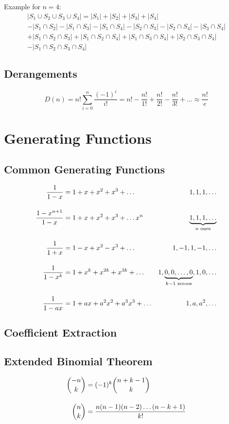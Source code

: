 \documentclass[12pt]{article}
\begin{document}
Example for $n=4:$
\newcommand{\dlist}[1]{S_{#1}}
\begin{multline*}
    |\dlist{1} \cup \dlist{2} \cup \dlist{3} \cup \dlist{4}| = |\dlist{1}| + |\dlist{2}| + |\dlist{3}| + |\dlist{4}|\\ 
    -|\dlist{1} \cap \dlist{2}| - |\dlist{1} \cap \dlist{3}| - |\dlist{1} \cap \dlist{4}| - |\dlist{2} \cap \dlist{3}| - |\dlist{2} \cap \dlist{4}| - |\dlist{3} \cap \dlist{4}|\\
    +|\dlist{1} \cap \dlist{2} \cap \dlist{3}| + |\dlist{1} \cap \dlist{2} \cap \dlist{4}| + |\dlist{1} \cap \dlist{3} \cap \dlist{4}| + |\dlist{2} \cap \dlist{3} \cap \dlist{4}|\\
    -|\dlist{1} \cap \dlist{2} \cap \dlist{3} \cap \dlist{4}|
\end{multline*}
\subsection{Derangements}
\[
    D(n) = n!\sum_{i=0}^n \frac{(-1)^i}{i!} = n! - \frac{n!}{1!} + \frac{n!}{2!} - \frac{n!}{3!} +\ldots \approx \frac{n!}{e}
\]

\pagebreak
\section{Generating Functions}
\subsection{Common Generating Functions}
\begin{equation*}
    \setlength{\jot}{.5cm}
    \begin{aligned}
    \frac{1}{1-x} &= 1 + x + x^2 + x^3 + \ldots & 1, 1, 1, \ldots\\  
    \frac{1-x^{n+1}}{1-x} &= 1 + x + x^2 + x^3 + \ldots x^n & \underbrace{1, 1, 1, \ldots}_{n\text{ ones}}\\
    \frac{1}{1+x} &= 1 - x + x^2 - x^3 + \ldots & 1, -1, 1, -1, \ldots\\  
    \frac{1}{1-x^k} &= 1 + x^k + x^{2k} + x^{3k} + \ldots & 1, \underbrace{0,0,\ldots,0}_{k-1\text{ zeroes}}, 1, 0,\ldots\\
    \frac{1}{1-ax} &= 1 + ax + a^2x^2 + a^3x^3 + \ldots & 1, a, a^2, \ldots\\
    \end{aligned}
\end{equation*}

\subsection{Coefficient Extraction}
\subsection{Extended Binomial Theorem}
\begin{equation*}
    \setlength{\jot}{.5cm}
    \begin{aligned}
    \binom{-n}{k} &= (-1)^k\binom{n+k-1}{k}\\
    \binom{n}{k} &= \frac{n(n-1)(n-2)\ldots(n-k+1)}{k!}
    \end{aligned}
\end{equation*}
\end{document}
